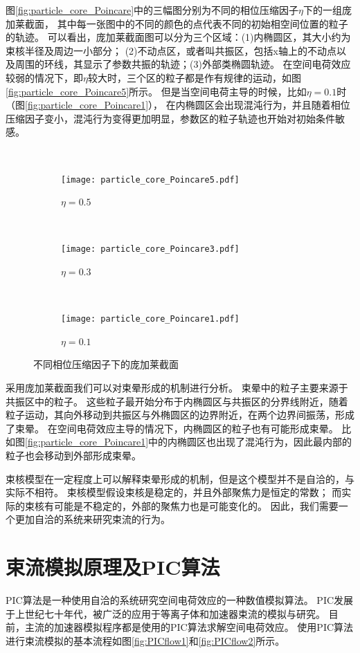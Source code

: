 图\eqref{fig:particle_core_Poincare}中的三幅图分别为不同的相位压缩因子$\eta$下的一组庞加莱截面，
其中每一张图中的不同的颜色的点代表不同的初始相空间位置的粒子的轨迹。
可以看出，庞加莱截面图可以分为三个区域：(1)内椭圆区，其大小约为束核半径及周边一小部分；
(2)不动点区，或者叫共振区，包括x轴上的不动点以及周围的环线，其显示了参数共振的轨迹；(3)外部类椭圆轨迹。
在空间电荷效应较弱的情况下，即$\eta$较大时，三个区的粒子都是作有规律的运动，如图\eqref{fig:particle_core_Poincare5}所示。
但是当空间电荷主导的时候，比如$\eta=0.1$时（图\eqref{fig:particle_core_Poincare1}），
在内椭圆区会出现混沌行为，并且随着相位压缩因子变小，混沌行为变得更加明显，参数区的粒子轨迹也开始对初始条件敏感。
\begin{figure}[!htbp]
  \centering
  ~%
  \begin{subfigure}[b]{0.6\textwidth}
    \texttt{[image: particle\_core\_Poincare5.pdf]}
    \caption{$\eta = 0.5$}
    \label{fig:particle_core_Poincare5}
  \end{subfigure}
  ~
  \begin{subfigure}[b]{0.6\textwidth}
    \texttt{[image: particle\_core\_Poincare3.pdf]}
    \caption{$\eta = 0.3$}
    \label{fig:particle_core_Poincare3}
  \end{subfigure}%
  ~
  \begin{subfigure}[b]{0.6\textwidth}
    \texttt{[image: particle\_core\_Poincare1.pdf]}
    \caption{$\eta = 0.1$}
    \label{fig:particle_core_Poincare1}
  \end{subfigure}%
  \caption{不同相位压缩因子下的庞加莱截面}
  \label{fig:particle_core_Poincare}
\end{figure}
采用庞加莱截面我们可以对束晕形成的机制进行分析。
束晕中的粒子主要来源于共振区中的粒子。
这些粒子最开始分布于内椭圆区与共振区的分界线附近，随着粒子运动，其向外移动到共振区与外椭圆区的边界附近，在两个边界间振荡，形成了束晕。
在空间电荷效应主导的情况下，内椭圆区的粒子也有可能形成束晕。
比如图\eqref{fig:particle_core_Poincare1}中的内椭圆区也出现了混沌行为，因此最内部的粒子也会移动到外部形成束晕。

束核模型在一定程度上可以解释束晕形成的机制，但是这个模型并不是自洽的，与实际不相符。
束核模型假设束核是稳定的，并且外部聚焦力是恒定的常数；
而实际的束核有可能是不稳定的，外部的聚焦力也是可能变化的。
因此，我们需要一个更加自洽的系统来研究束流的行为。

\section{束流模拟原理及PIC算法}    \label{section:PIC_algorithm}
PIC算法是一种使用自洽的系统研究空间电荷效应的一种数值模拟算法\cite{hockney1988computer,PIC_luccio2002space}。
PIC发展于上世纪七十年代，被广泛的应用于等离子体和加速器束流的模拟与研究。
目前，主流的加速器模拟程序都是使用的PIC算法求解空间电荷效应\cite{PIC_Birdsall1991, PIC_friedman1992, PIC_ji2000, PIC_ji2004, PIC_Amundson2006229, PIC_tracewin2014, PIC_beampath2005}。
使用PIC算法进行束流模拟的基本流程如图\eqref{fig:PICflow1}和\eqref{fig:PICflow2}所示。

